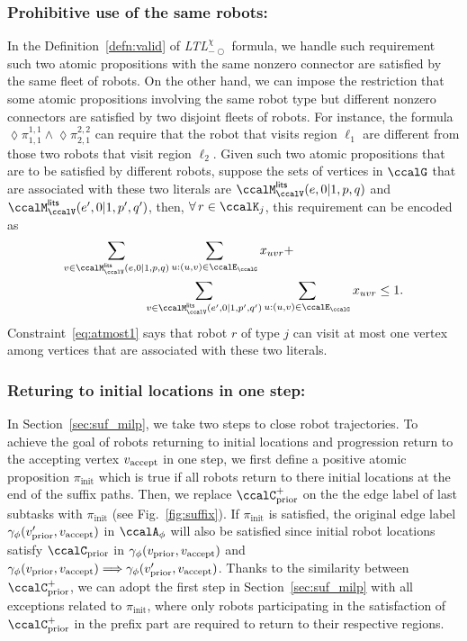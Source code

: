 \documentclass[Afour,sageh,times]{sagej}
\newcommand{\ltlx}{ {\it LTL}$_{-\bigcirc}^\chi$ }
\newcommand{\autop}{\ccalA_{\phi}}
\newcommand{\vertex}[1]{v_{\textup{#1}}}
\newcommand{\simplies}{\DOTSB\Longrightarrow}
\renewcommand{\ap}[3]{\mathcal{\pi}_{{#1},{#2}}^{#3}}
\begin{document}
{{\subsubsection{Prohibitive use of the same robots:} In the Definition~\ref{defn:valid} of \ltlx formula, we handle such requirement such two atomic propositions with the same nonzero connector are satisfied by the same fleet of robots. On the other hand, we can impose the restriction that some atomic propositions involving the same robot type but different nonzero connectors are satisfied by two disjoint fleets of robots. For instance, the formula $\lozenge \ap{1}{1}{1,1} \wedge \lozenge \ap{2}{1}{2,2}$ can require that the robot that visits region $\ell_1$ are different from those two robots that visit region $\ell_2$. Given such two atomic propositions that are to be  satisfied by different robots, suppose the sets of vertices in $\ccalG$ that are associated with these two literals are $\ccalM_{\ccalV}^\mathsf{lits} (e, 0|1, p, q)$ and $\ccalM_{\ccalV}^\mathsf{lits} (e', 0|1, p', q')$, then, $\forall \, r \in \ccalK_j$, this requirement can be encoded as
\begin{align}\label{eq:atmost1}
  \sum_{v\in \ccalM_{\ccalV}^\mathsf{lits} (e, 0|1, p, q)} & \sum_{u: (u,v) \in \ccalE_\ccalG} x_{uvr} + \nonumber \\
 & \hspace{-2em}  \sum_{v\in \ccalM_{\ccalV}^\mathsf{lits} (e', 0|1, p', q')} \sum_{u: (u,v) \in \ccalE_\ccalG}  x_{uvr} \leq 1.
\end{align}
Constraint~\eqref{eq:atmost1} says that robot $r$ of type $j$ can visit at most one vertex among vertices that are associated with these two literals.


\subsubsection{Returing to initial locations in one step:}\label{app:loop}
In Section~\ref{sec:suf_milp}, we take two steps to close robot trajectories. To achieve the goal of robots returning to initial locations and progression return to the accepting vertex $\vertex{accept}$ in one step, we first define a positive atomic proposition $\pi_{\text{init}}$ which is true if all robots return to there initial locations at the end of the suffix paths. Then, we replace $\ccalC_{\text{prior}}^+$ on the the edge label of last subtasks with $\pi_{\text{init}}$ (see Fig.~\ref{fig:suffix}). If $\pi_{\text{init}}$ is satisfied, the original edge label $ \gamma_\phi(\vertex{prior}', \vertex{accept})$ in $\autop$ will also be satisfied since initial robot locations satisfy $\ccalC_{\text{prior}}$ in $\gamma_\phi(\vertex{prior}, \vertex{accept})$ and $\gamma_\phi(\vertex{prior}, \vertex{accept}) \simplies \gamma_\phi(\vertex{prior}', \vertex{accept})$. Thanks to the similarity between $\ccalC_{\text{prior}}^+$, we can adopt the first step in Section~\ref{sec:suf_milp} with all exceptions related to $\pi_{\text{init}}$, where only robots participating in the satisfaction of $\ccalC_{\text{prior}}^+$ in the prefix part are required to return to their respective regions.

}}
\end{document}
